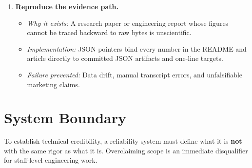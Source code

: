\begin{enumerate}
    \item \textbf{Reproduce the evidence path.}
    \begin{itemize}
        \item \textit{Why it exists:} A research paper or engineering report whose figures cannot be traced backward to raw bytes is unscientific.
        \item \textit{Implementation:} JSON pointers bind every number in the README and article directly to committed JSON artifacts and one-line  targets.
        \item \textit{Failure prevented:} Data drift, manual transcript errors, and unfalsifiable marketing claims.
    \end{itemize}
\end{enumerate}

\vspace{12pt}
\section{System Boundary}

To establish technical credibility, a reliability system must define what it is \textbf{not} with the same rigor as what it is. Overclaiming scope is an immediate disqualifier for staff-level engineering work.

